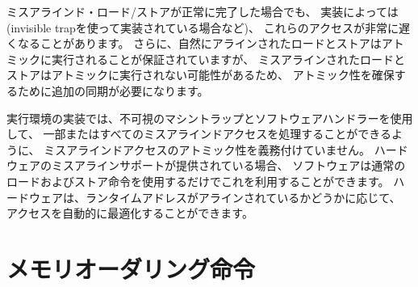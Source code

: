 \begin{comment}
Even when misaligned loads and stores complete successfully, these
accesses might run extremely slowly depending on the implementation
(e.g., when implemented via an invisible trap).  Furthermore, whereas
naturally aligned loads and stores are guaranteed to execute
atomically, misaligned loads and stores might not, and hence
require additional synchronization to ensure atomicity.
\end{comment}

ミスアラインド・ロード/ストアが正常に完了した場合でも、
実装によっては(invisible trapを使って実装されている場合など)、
これらのアクセスが非常に遅くなることがあります。 
さらに、自然にアラインされたロードとストアはアトミックに実行されることが保証されていますが、
ミスアラインされたロードとストアはアトミックに実行されない可能性があるため、
アトミック性を確保するために追加の同期が必要になります。

\begin{commentary}
\begin{comment}
We do not mandate atomicity for misaligned accesses so execution
environment implementations can use an invisible machine trap and
a software handler to handle some or all misaligned accesses.  If
hardware misaligned support is provided, software can exploit this by
simply using regular load and store instructions.  Hardware can then
automatically optimize accesses depending on whether runtime addresses
are aligned.
\end{comment}

実行環境の実装では、不可視のマシントラップとソフトウェアハンドラーを使用して、
一部またはすべてのミスアラインドアクセスを処理することができるように、
ミスアラインドアクセスのアトミック性を義務付けていません。 
ハードウェアのミスアラインサポートが提供されている場合、
ソフトウェアは通常のロードおよびストア命令を使用するだけでこれを利用することができます。 
ハードウェアは、ランタイムアドレスがアラインされているかどうかに応じて、
アクセスを自動的に最適化することができます。
\end{commentary}

\pagebreak

\begin{comment}
\section{Memory Ordering Instructions}
\end{comment}
\section{メモリオーダリング命令}
\label{sec:fence}

